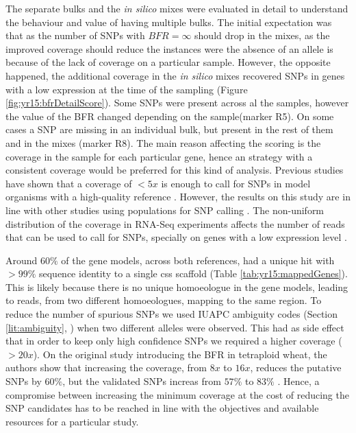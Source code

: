 The separate bulks and the \textit{in silico} mixes were evaluated in detail to understand the behaviour and value of having multiple bulks. 
The initial expectation was that as the number of SNPs with $BFR=\infty$ should drop in the mixes, as the improved coverage should reduce the instances were the absence of an allele is because of the lack of coverage on a particular sample. 
However, the opposite happened, the additional coverage in the \textit{in silico} mixes recovered SNPs in genes with a low expression at the time of the sampling (Figure \ref{fig:yr15:bfrDetailScore}).  
Some SNPs were present across al the samples, however the value of the BFR changed depending on the sample(marker R5). 
On some cases a SNP are missing in an individual bulk, but present in the rest of them and in the mixes (marker R8). 
The main reason affecting the scoring is the coverage in the sample for each particular gene, hence an strategy with a consistent coverage would be preferred for this kind of analysis.  
Previous studies have shown that a coverage of $<5x$ is enough to call for SNPs in model organisms with a high-quality reference \citep{Schneeberger2011}.
However, the results on this study are in line with other studies using populations for SNP calling \citep{Abe2012,Takagi2013}. 
The non-uniform distribution of the coverage in RNA-Seq experiments affects the number of reads that can be used to call for SNPs, specially on genes with a low expression level \citep{Mortazavi2008}. 



Around $60\%$ of the gene models, across both references, had a unique hit with $>99\%$ sequence identity to a single \acrshort{css} scaffold (Table \ref{tab:yr15:mappedGenes}). 
This is likely because there is no unique homoeologue in the gene models, leading to reads, from two different homoeologues, mapping to the same region.
To reduce the number of spurious SNPs we used IUAPC ambiguity codes (Section \ref{lit:ambiguity}, \citet{Cornish-Bowden1985}) when two different alleles were observed.
This had as side effect that in order to keep only high confidence SNPs we required a higher coverage ($>20x$). 
On the original study introducing the BFR in tetraploid wheat, the authors show that increasing the coverage, from $8x$ to $16x$, reduces the putative SNPs by $60\%$, but the validated SNPs increas from $57\%$ to $83\%$ \citep{Trick2012}. 
Hence, a compromise between increasing the minimum coverage at the cost of reducing the SNP candidates has to be reached in line with the objectives and available resources for a particular study. 

